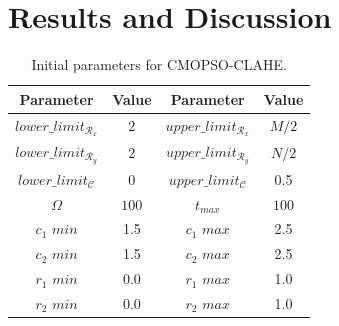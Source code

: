 \documentclass[11pt]{article}
\begin{document}
\section{Results and Discussion}\label{sec:results_discussion}

\begin{table}[H]
\setlength{\abovecaptionskip}{2pt plus 3pt minus 2pt} %
\caption[Parámetros de entrada para $MOPSO$]{Initial parameters for CMOPSO-CLAHE.}
\begin{center}
 \begin{tabular}{||c c | c c||} 
 \hline
 Parameter & Value & Parameter & Value \\ [0.5ex] 
 \hline\hline
 $lower\_limit_{\mathscr{R}_x}$ & $2$ & $upper\_limit_{\mathscr{R}_x}$ & $M/2$ \\ 
 \hline
 $lower\_limit_{\mathscr{R}_y}$ & $2$ & $upper\_limit_{\mathscr{R}_y}$ & $N/2$ \\  
 \hline
 $lower\_limit_{{\mathscr{C}}}$ & $0$ & $upper\_limit_{{\mathscr{C}}}$ & 0.5 \\
\hline
$\Omega$ & $100$ & $t_{max}$ & $100$ \\ 
\hline
$c_1$ $min$ & 1.5 & $c_1$ $max$ & 2.5 \\ 
\hline
$c_2$ $min$ & 1.5 & $c_2$ $max$ & 2.5 \\ 
\hline
$r_1$ $min$ & 0.0 & $r_1$ $max$ & 1.0 \\ 
\hline
$r_2$ $min$ & 0.0 & $r_2$ $max$ & 1.0 \\
\hline
\end{tabular}
\end{center}
\label{table:parametrospso}
\end{table}
\end{document}
